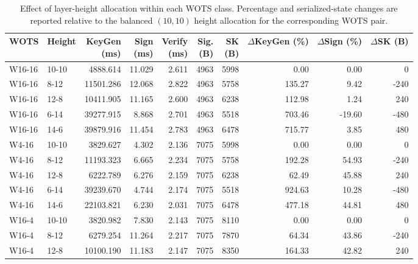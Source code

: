 
\begin{table}[t]
\centering
\caption{Effect of layer-height allocation within each WOTS class. Percentage and serialized-state changes are reported relative to the balanced $(10,10)$ height allocation for the corresponding WOTS pair.}
\label{tab:height-allocation}
\scriptsize
\setlength{\tabcolsep}{1.2pt}
\begin{tabular}{llrrrrrrrr}
\toprule
WOTS &
Height &
\shortstack{KeyGen\\(ms)} &
\shortstack{Sign\\(ms)} &
\shortstack{Verify\\(ms)} &
\shortstack{Sig.\\(B)} &
\shortstack{SK\\(B)} &
\shortstack{$\Delta$KeyGen\\(\%)} &
\shortstack{$\Delta$Sign\\(\%)} &
\shortstack{$\Delta$SK\\(B)} \\
\midrule
W16-16 & 10-10 & 4888.614 & 11.029 & 2.611 & 4963 & 5998 & 0.00 & 0.00 & 0 \\
W16-16 & 8-12 & 11501.286 & 12.068 & 2.822 & 4963 & 5758 & 135.27 & 9.42 & -240 \\
W16-16 & 12-8 & 10411.905 & 11.165 & 2.600 & 4963 & 6238 & 112.98 & 1.24 & 240 \\
W16-16 & 6-14 & 39277.915 & 8.868 & 2.701 & 4963 & 5518 & 703.46 & -19.60 & -480 \\
W16-16 & 14-6 & 39879.916 & 11.454 & 2.783 & 4963 & 6478 & 715.77 & 3.85 & 480 \\
W4-16 & 10-10 & 3829.627 & 4.302 & 2.136 & 7075 & 5998 & 0.00 & 0.00 & 0 \\
W4-16 & 8-12 & 11193.323 & 6.665 & 2.234 & 7075 & 5758 & 192.28 & 54.93 & -240 \\
W4-16 & 12-8 & 6222.789 & 6.276 & 2.159 & 7075 & 6238 & 62.49 & 45.88 & 240 \\
W4-16 & 6-14 & 39239.670 & 4.744 & 2.174 & 7075 & 5518 & 924.63 & 10.28 & -480 \\
W4-16 & 14-6 & 22103.821 & 6.230 & 2.031 & 7075 & 6478 & 477.18 & 44.81 & 480 \\
W16-4 & 10-10 & 3820.982 & 7.830 & 2.143 & 7075 & 8110 & 0.00 & 0.00 & 0 \\
W16-4 & 8-12 & 6279.254 & 11.264 & 2.217 & 7075 & 7870 & 64.34 & 43.86 & -240 \\
W16-4 & 12-8 & 10100.190 & 11.183 & 2.147 & 7075 & 8350 & 164.33 & 42.82 & 240 \\

\end{tabular}
\end{table}
